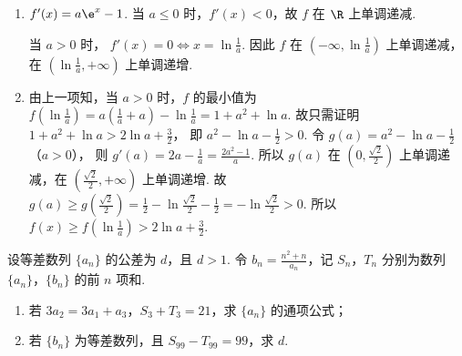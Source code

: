 \begin{solution}
\begin{enumerate}
\item
\(f'(x)=a\e^x-1\).
当 \(a\le 0\) 时，\(f'(x)<0\)，故 \(f\) 在 \(\R\) 上单调递减.

当 \(a>0\) 时，
\(f'(x)=0 \iff x=\ln\frac1a\).
因此 \(f\) 在 \((-\infty,\ln\frac1a)\) 上单调递减，在 \((\ln\frac1a,+\infty)\) 上单调递增.

\item 由上一项知，当 \(a>0\) 时，\(f\) 的最小值为
\(f\left(\ln\frac1a\right) =a\left(\frac1a+a\right)-\ln\frac1a =1+a^2+\ln a\).
故只需证明
\(1+a^2+\ln a>2\ln a+\frac32\)，
即
\(a^2-\ln a-\frac12>0\).
令
\(g(a)=a^2-\ln a-\frac12\)（\(a>0\)），
则
\(g'(a)=2a-\frac1a=\frac{2a^2-1}{a}\).
所以 \(g(a)\) 在 \((0,\frac{\sqrt2}{2})\) 上单调递减，在 \((\frac{\sqrt2}{2},+\infty)\) 上单调递增.
故
\(g(a)\ge g\left(\frac{\sqrt2}{2}\right) =\frac12-\ln\frac{\sqrt2}{2}-\frac12 =-\ln\frac{\sqrt2}{2}>0\).
所以
\(f(x)\ge f\left(\ln\frac1a\right)>2\ln a+\frac32\).
\end{enumerate}
\end{solution}

\begin{problem}
设等差数列 \(\{a_n\}\) 的公差为 \(d\)，且 \(d>1\). 令 \(b_n=\frac{n^2+n}{a_n}\)，记 \(S_n\)，\(T_n\) 分别为数列 \(\{a_n\}\)，\(\{b_n\}\) 的前 \(n\) 项和.
\begin{enumerate}
\item 若 \(3a_2=3a_1+a_3\)，\(S_3+T_3=21\)，求 \(\{a_n\}\) 的通项公式；
\item 若 \(\{b_n\}\) 为等差数列，且 \(S_{99}-T_{99}=99\)，求 \(d\).
\end{enumerate}
\end{problem}

